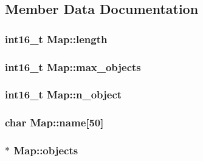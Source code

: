 \subsection{Member Data Documentation}
\hypertarget{class_map_a48caa289073dbeff9c89a02cf89a2cc6}{}
\subsubsection[{length}]{\setlength{\rightskip}{0pt plus 5cm}int16\+\_\+t Map\+::length\hspace{0.3cm}{\ttfamily [protected]}}\label{class_map_a48caa289073dbeff9c89a02cf89a2cc6}
\hypertarget{class_map_a6cb94f4c91b4634128ccf0219f84d1ab}{}
\subsubsection[{max\+\_\+objects}]{\setlength{\rightskip}{0pt plus 5cm}int16\+\_\+t Map\+::max\+\_\+objects\hspace{0.3cm}{\ttfamily [protected]}}\label{class_map_a6cb94f4c91b4634128ccf0219f84d1ab}
\hypertarget{class_map_ad428bf938f205ed6d1e7af2ddd09b7ce}{}
\subsubsection[{n\+\_\+object}]{\setlength{\rightskip}{0pt plus 5cm}int16\+\_\+t Map\+::n\+\_\+object\hspace{0.3cm}{\ttfamily [protected]}}\label{class_map_ad428bf938f205ed6d1e7af2ddd09b7ce}
\hypertarget{class_map_abe0a2d1af671ad7ca47651a8d207b23c}{}
\subsubsection[{name}]{\setlength{\rightskip}{0pt plus 5cm}char Map\+::name\mbox{[}50\mbox{]}\hspace{0.3cm}{\ttfamily [protected]}}\label{class_map_abe0a2d1af671ad7ca47651a8d207b23c}
\hypertarget{class_map_a1028fa8db721f28473ba471ae70fde09}{}
\subsubsection[{objects}]{$\ast$ Map\+::objects\hspace{0.3cm}{\ttfamily [protected]}}\label{class_map_a1028fa8db721f28473ba471ae70fde09}
\hypertarget{class_map_a6e7ba89e3a0a05633ae7d27dd400190f}{}
